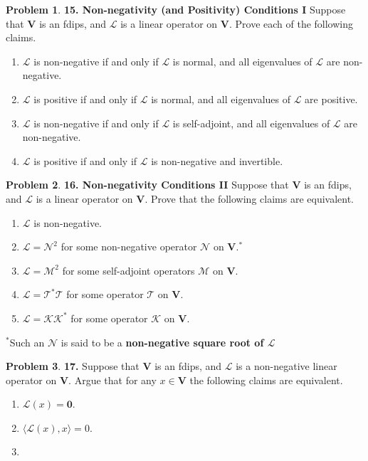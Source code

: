\documentclass{book}
\theoremstyle{definition}
\newtheorem*{prob*}{Problem}
\newcommand{\V}{\mathbf{V}}
\newcommand{\lag}{\mathcal{L}}
\newcommand{\M}{\mathcal{M}}
\newcommand{\K}{\mathcal{K}}
\newcommand{\N}{\mathcal{N}}
\newcommand{\T}{\mathcal{T}}
\newcommand{\la}{\langle}
\newcommand{\ra}{\rangle}
\begin{document}
\begin{prob*}\textbf{15. Non-negativity (and Positivity) Conditions I}
	Suppose that $\V$ is an fdips, and $\lag$ is a linear operator on $\V$. Prove each of the following claims.
	\begin{enumerate}
		\item $\lag$ is non-negative if and only if $\lag$ is normal, and all eigenvalues of $\lag$ are non-negative. 
		
		\item $\lag$ is positive if and only if $\lag$ is normal, and all eigenvalues of $\lag$ are positive. 
		
		\item $\lag$ is non-negative if and only if $\lag$ is self-adjoint, and all eigenvalues of $\lag$ are non-negative.
		
		\item $\lag$ is positive if and only if $\lag$ is non-negative and invertible. 
	\end{enumerate}
	
\end{prob*}

\newpage





\begin{prob*}\textbf{16. Non-negativity Conditions II}
	Suppose that $\V$ is an fdips, and $\lag$ is a linear operator on $\V$. Prove that the following claims are equivalent.
	\begin{enumerate}
		\item $\lag$ is non-negative.
		\item $\lag = \N^2$ for some non-negative operator $\N$ on $\V$.$^*$
		\item $\lag = \M^2$ for some self-adjoint operators $\M$ on $\V$.
		\item $\lag = \T^*\T$ for some operator $\T$ on $\V$.
		\item $\lag = \K \K^*$ for some operator $\K$ on $\V$.
	\end{enumerate}	
	$^*$Such an $\N$ is said to be a \textbf{non-negative square root of $\lag$}
	
\end{prob*}



\newpage



\begin{prob*}\textbf{17.}
	Suppose that $\V$ is an fdips, and $\lag$ is a non-negative linear operator on $\V$. Argue that for any $x \in \V$ the following claims are equivalent.
	\begin{enumerate}
		\item $\lag(x) = \mathbf{0}$.
		\item $\la \lag(x),x \ra = 0$.
		\item 
	\end{enumerate}
	
\end{prob*}
\end{document}
